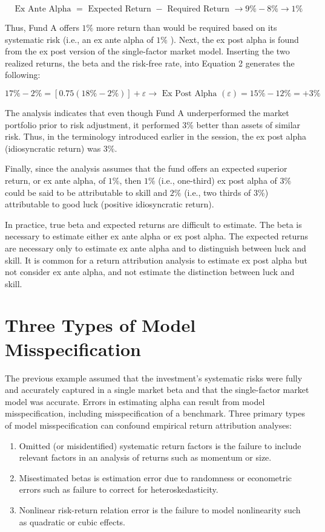 \documentclass[11pt]{article}
\begin{document}
$$
\text { Ex Ante Alpha }=\text { Expected Return }- \text { Required Return } \rightarrow 9 \%-8 \% \rightarrow 1 \%
$$

Thus, Fund A offers $1 \%$ more return than would be required based on its systematic risk (i.e., an ex ante alpha of $1 \%$ ). Next, the ex post alpha is found from the ex post version of the single-factor market model. Inserting the two realized returns, the beta and the risk-free rate, into Equation 2 generates the following:

$$
17 \%-2 \%=[0.75(18 \%-2 \%)]+\varepsilon \rightarrow \text { Ex Post Alpha }(\varepsilon)=15 \%-12 \%=+3 \%
$$

The analysis indicates that even though Fund A underperformed the market portfolio prior to risk adjustment, it performed 3\% better than assets of similar risk. Thus, in the terminology introduced earlier in the session, the ex post alpha (idiosyncratic return) was $3 \%$.

Finally, since the analysis assumes that the fund offers an expected superior return, or ex ante alpha, of $1 \%$, then $1 \%$ (i.e., one-third) ex post alpha of $3 \%$ could be said to be attributable to skill and $2 \%$ (i.e., two thirds of 3\%) attributable to good luck (positive idiosyncratic return).

In practice, true beta and expected returns are difficult to estimate. The beta is necessary to estimate either ex ante alpha or ex post alpha. The expected returns are necessary only to estimate ex ante alpha and to distinguish between luck and skill. It is common for a return attribution analysis to estimate ex post alpha but not consider ex ante alpha, and not estimate the distinction between luck and skill.

\section*{Three Types of Model Misspecification}
The previous example assumed that the investment's systematic risks were fully and accurately captured in a single market beta and that the single-factor market model was accurate. Errors in estimating alpha can result from model misspecification, including misspecification of a benchmark. Three primary types of model misspecification can confound empirical return attribution analyses:

\begin{enumerate}
  \item Omitted (or misidentified) systematic return factors is the failure to include relevant factors in an analysis of returns such as momentum or size.

  \item Misestimated betas is estimation error due to randomness or econometric errors such as failure to correct for heteroskedasticity.

  \item Nonlinear risk-return relation error is the failure to model nonlinearity such as quadratic or cubic effects.

\end{enumerate}
\end{document}
